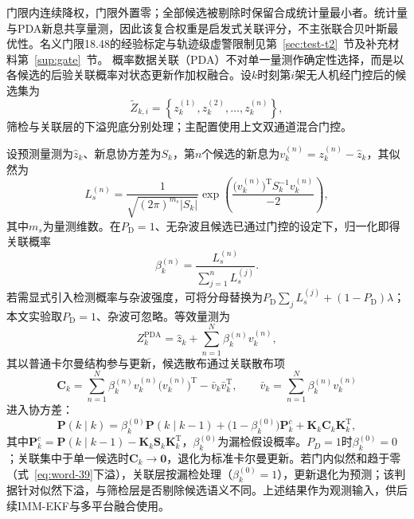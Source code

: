 \documentclass[UTF8,a4paper,zihao=-4]{ctexart}
\begin{document}
门限内连续降权，门限外置零；全部候选被剔除时保留合成统计量最小者。统计量与PDA新息共享量测，因此该复合权重是启发式关联评分，不主张联合贝叶斯最优性。名义门限18.48的经验标定与轨迹级虚警限制见第~\ref{sec:test-t2}~节及补充材料第~\ref{sup:gate}~节。
概率数据关联（PDA）不对单一量测作确定性选择，而是以各候选的后验关联概率对状态更新作加权融合\cite{barshalom2009}。设\(k\)时刻第\(i\)架无人机经门控后的候选集为
\begin{equation}
\widetilde{Z}_{k,i}=\left\{z_k^{(1)},z_k^{(2)},\ldots,z_k^{(n)}\right\},
\label{eq:word-36}
\end{equation}
筛检与关联层的下溢兜底分别处理；主配置使用上文双通道混合门控。

设预测量测为\(\hat{z}_k\)、新息协方差为\(S_k\)，第\(n\)个候选的新息为\(v_k^{(n)}=z_k^{(n)}-\hat{z}_k\)，其似然为
\begin{equation}
L_s^{(n)}=\frac{1}{\sqrt{(2\pi)^{m_s}|S_k|}}\exp\!\left(\frac{\bigl(v_k^{(n)}\bigr)^{\mathrm T}S_k^{-1}v_k^{(n)}}{-2}\right),
\label{eq:word-39}
\end{equation}
其中\(m_s\)为量测维数。在\(P_{\mathrm D}=1\)、无杂波且候选已通过门控的设定下，归一化即得关联概率
\begin{equation}
\beta_k^{(n)}=\frac{L_s^{(n)}}{\sum_{j=1}^{n}L_s^{(j)}}.
\label{eq:word-45}
\end{equation}
若需显式引入检测概率与杂波强度，可将分母替换为\(P_{\mathrm D}\sum_j L_s^{(j)}+(1-P_{\mathrm D})\lambda\)；本文实验取\(P_{\mathrm D}=1\)、杂波可忽略。等效量测为
\begin{equation}
Z_k^{\mathrm{PDA}}=\hat{z}_k+\sum_{n=1}^{N}\beta_k^{(n)}v_k^{(n)},
\label{eq:word-49}
\end{equation}
其以普通卡尔曼结构参与更新，候选散布通过关联散布项
\begin{equation}
\mathbf{C}_k=\sum_{n=1}^{N}\beta_k^{(n)}v_k^{(n)}\bigl(v_k^{(n)}\bigr)^{\mathrm T}-\bar{v}_k\bar{v}_k^{\mathrm T},\qquad
\bar{v}_k=\sum_{n=1}^{N}\beta_k^{(n)}v_k^{(n)}
\label{eq:pda-spread}
\end{equation}
进入协方差：
\begin{equation}
\mathbf{P}(k\mid k)=\beta_k^{(0)}\mathbf{P}(k\mid k-1)+\bigl(1-\beta_k^{(0)}\bigr)\mathbf{P}_k^{c}+\mathbf{K}_k\mathbf{C}_k\mathbf{K}_k^{\mathrm T},
\label{eq:word-51}
\end{equation}
其中\(\mathbf{P}_k^{c}=\mathbf{P}(k\mid k-1)-\mathbf{K}_k\mathbf{S}_k\mathbf{K}_k^{\mathrm T}\)，\(\beta_k^{(0)}\)为漏检假设概率。\(P_D=1\)时\(\beta_k^{(0)}=0\)；关联集中于单一候选时\(\mathbf{C}_k\to\mathbf{0}\)，退化为标准卡尔曼更新。若门内似然和趋于零（式~\eqref{eq:word-39}下溢），关联层按漏检处理（\(\beta_k^{(0)}=1\)），更新退化为预测；该判据针对似然下溢，与筛检层是否剔除候选语义不同。上述结果作为观测输入，供后续IMM-EKF与多平台融合使用。
\end{document}
